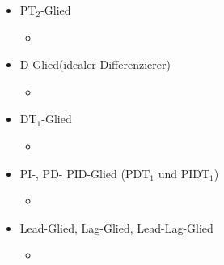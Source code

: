 \documentclass[margin=normal]{tex/hsrzf}
\begin{document}
\begin{itemize}
\begin{itemize}
                  \item PT$_2$-Glied
                        \begin{itemize}
                              \item %
                        \end{itemize}
                  \item D-Glied(idealer Differenzierer)
                        \begin{itemize}
                              \item %
                        \end{itemize}
                  \item DT$_1$-Glied
                        \begin{itemize}
                              \item %
                        \end{itemize}
                  \item PI-, PD- PID-Glied (PDT$_1$ und PIDT$_1$)
                        \begin{itemize}
                              \item %
                        \end{itemize}
                  \item Lead-Glied, Lag-Glied, Lead-Lag-Glied
                        \begin{itemize}
                              \item %
                        \end{itemize}

            \end{itemize}
\end{itemize}
\end{document}
